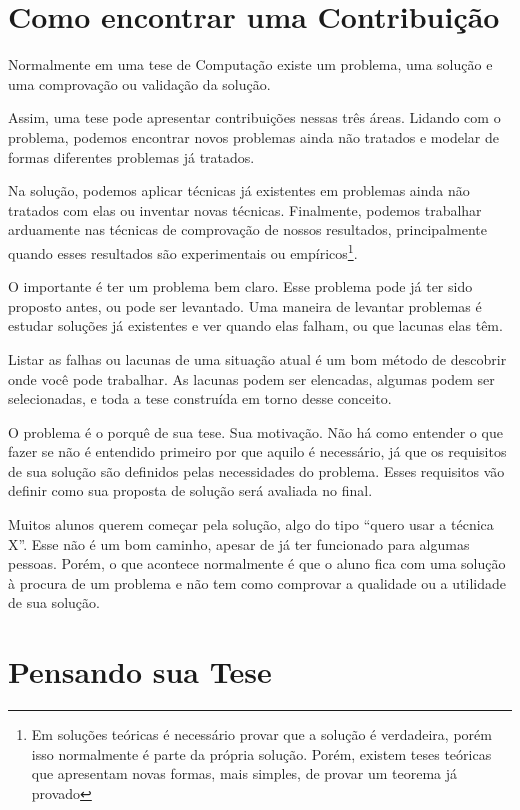 \section{Como encontrar uma Contribuição}

Normalmente em uma tese de Computação existe um problema, uma solução e uma comprovação ou validação da solução. 

Assim, uma tese pode apresentar contribuições nessas três áreas. Lidando com o problema, podemos encontrar novos problemas ainda não tratados e modelar de formas diferentes problemas já tratados.

Na solução, podemos aplicar técnicas já existentes em problemas ainda não tratados com elas ou inventar novas técnicas. Finalmente, podemos trabalhar arduamente nas técnicas de comprovação de nossos resultados, principalmente quando esses resultados são experimentais ou empíricos\footnote{Em soluções teóricas é necessário provar que a solução é verdadeira, porém isso normalmente é parte da própria solução. Porém, existem teses teóricas que apresentam novas formas, mais simples, de provar um teorema já provado}.

O importante é ter um problema bem claro. Esse problema pode já ter sido proposto antes, ou pode ser levantado. Uma maneira de levantar problemas é estudar soluções já existentes e ver quando elas falham, ou que lacunas elas têm. 

Listar as falhas ou lacunas de uma situação atual é um bom método de descobrir onde você pode trabalhar. As lacunas podem ser elencadas, algumas podem ser selecionadas, e toda a tese construída em torno desse conceito.

O problema é o porquê de sua tese. Sua motivação. Não há como entender o que fazer se não é entendido primeiro por que aquilo é necessário, já que os requisitos de sua solução são definidos pelas necessidades do problema. Esses requisitos vão definir como sua proposta de solução será avaliada no final.

Muitos alunos querem começar pela solução, algo do tipo “quero usar a técnica X”. Esse não é um bom caminho, apesar de já ter funcionado para algumas pessoas. Porém, o que acontece normalmente é que o aluno fica com uma solução à procura de um problema e não tem como comprovar a qualidade ou a utilidade de sua solução.


\section{Pensando sua Tese}

